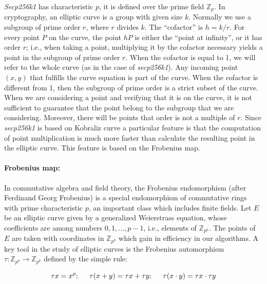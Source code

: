 \documentclass{article}
\begin{document}
\textit{Secp256k1} has characteristic \(p\), it is defined over the prime field \(\mathbb{Z}_{p}\). In cryptography, an elliptic curve is a group with given size \(k\). Normally we use a subgroup of prime order \(r\), where \(r\) divides \(k\). The “cofactor” is \(h = k/r\). For every point \(P\) on the curve, the point \(hP\) is either the “point at infinity”, or it has order \(r\); i.e., when taking a point, multiplying it by the cofactor necessary yields a point in the subgroup of prime order \(r\).\newline
When the cofactor is equal to 1, we will refer to the whole curve (as in the case of \textit{secp256k1}). Any incoming point \((x,y)\) that fulfills the curve equation is part of the curve. When the cofactor is different from 1, then the subgroup of prime order is a strict subset of the curve. When we are considering a point and verifying that it is on the curve, it is not sufficient to guarantee that the point belong to the subgroup that we are considering. Moreover, there will be points that order is not a multiple of \(r\).\newline
Since \textit{secp256k1} is based on Kobraliz curve a particular feature is that the computation of point multiplication is much more faster than calculate the resulting point in the elliptic curve. This feature is based on the Frobenius map.

\paragraph*{Frobenius map:}
In commutative algebra and field theory, the Frobenius endomorphism (after Ferdinand Georg Frobenius) is a special endomorphism of commutative rings with prime characteristic \(p\), an important class which includes finite fields.\newline
Let \(E\) be an elliptic curve given by a generalized Weierstrass equation, whose coefficients are among numbers \(0, 1, ..., p - 1\), i.e., elements of \(\mathbb{Z}_{p^k}\). The points of \(E\) are taken with coordinates in \(\mathbb{Z}_{p^k}\) which gain in efficiency in our algorithms. A key tool in the study of elliptic curves is the Frobenius automorphism \(\tau : \mathbb{Z}_{p^k} \rightarrow \mathbb{Z}_{p^k}\) defined by the simple rule:

\[\tau x = x^p;\hspace{0.5cm}\tau(x+y) = \tau x+\tau y;\hspace{0.5cm}\tau(x \cdot y) =  \tau x \cdot \tau y\]
\end{document}
